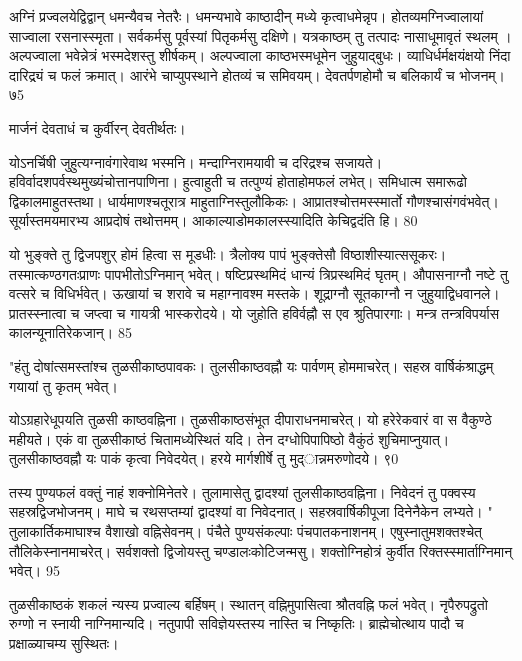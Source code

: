 अग्निं प्रज्वलयेद्विद्वान् धमन्यैवच नेतरैः।
धमन्यभावे काष्ठादीन् मध्ये कृत्वाधमेन्नृप।
होतव्यमग्निज्वालायां साज्वाला रसनास्स्मृता।
सर्वकर्मसु पूर्वस्यां पितृकर्मसु दक्षिणे।
यत्रकाष्ठम् तु तत्पादः नासाधूमावृतं स्थलम् ।
अल्पज्वाला भवेन्नेत्रं भस्मदेशस्तु शीर्षकम्।
अल्पज्वाला काष्ठभस्मधूमेन जुहुयाद्बुधः।
व्याधिर्धर्मक्षयंक्षयो निंदा दारिद्र्यं च फलं क्रमात्।
आरंभे चाप्युपस्थाने होतव्यं च समिवयम्।
देवतर्पणहोमौ च बलिकार्यं च भोजनम्।
७5

मार्जनं देवताधं च कुर्वीरन् देवतीर्थतः।

योऽनर्चिषी जुहुत्यग्नावंगारेवाथ भस्मनि।
मन्दाग्निरामयावी च दरिद्रश्च सजायते।
हविर्वादशपर्वस्थमुख्यंचोत्तानपाणिना।
हुत्वाहुती च तत्पुण्यं होताहोमफलं लभेत्।
समिधात्म समारूढो द्विकालमाहुतस्तथा।
धार्यमाणश्चतूरात्र माहुताग्निस्तुलौकिकः।
आप्रातश्चोत्तमस्स्मार्तो गौणश्चासंगवंभवेत्।
सूर्यास्तमयमारभ्य आप्रदोषं तथोत्तमम्।
आकाल्याडोमकालस्स्यादिति केचिद्वदंति हि।
80

यो भुङ्क्ते तु द्विजपशुर् होमं हित्वा स मूडधीः।
त्रैलोक्य पापं भुङ्क्तेसौ विष्ठाशीस्यात्ससूकरः।
तस्मात्कण्ठगतःप्राणः पापभीतोऽग्निमान् भवेत्।
षष्टिप्रस्थमिदं धान्यं त्रिप्रस्थमिदं घृतम्।
औपासनाग्नौ नष्टे तु वत्सरे च विधिर्भवेत्।
ऊखायां च शरावे च महाग्नावश्म मस्तके।
शूद्राग्नौ सूतकाग्नौ न जुहुयाद्विधवानले।
प्रातस्स्नात्वा च जप्त्वा च गायत्री भास्करोदये।
यो जुहोति हविर्वह्नौ स एव श्रुतिपारगाः।
मन्त्र तन्त्रविपर्यास कालन्यूनातिरेकजान्।
85

"हंतु दोषांत्समस्तांश्च तुळसीकाष्ठपावकः।
तुलसीकाष्ठवह्नौ यः पार्वणम् होममाचरेत्।
सहस्र वार्षिकंश्राद्धम् गयायां तु कृतम् भवेत्।

योऽग्रहारेधूपयति तुळसी काष्ठवह्निना।
तुळसीकाष्ठसंभूत दीपाराधनमाचरेत्।
यो हरेरेकवारं वा स वैकुण्ठे महीयते।
एकं वा तुळसीकाष्ठं चितामध्येस्थितं यदि।
तेन दग्धोपिपापिष्ठो वैकुंठं शुचिमाप्नुयात्।
तुलसीकाष्ठवह्नौ यः पाकं कृत्वा निवेदयेत्।
हरये मार्गशीर्षे तु मुद्ान्नमरुणोदये।
९0

तस्य पुण्यफलं वक्तुं नाहं शक्नोमिनेतरे।
तुलामासेतु द्वादश्यां तुलसीकाष्ठवह्निना।
निवेदनं तु पक्वस्य सहस्रद्विजभोजनम्।
माघे च रथसप्तम्यां द्वादश्यां वा निवेदनात्।
सहस्रवार्षिकीपूजा दिनेनैकेन लभ्यते।
" तुलाकार्तिकमाघाश्च वैशाखो वह्निसेवनम्।
पंचैते पुण्यसंकल्पाः पंचपातकनाशनम्।
एषुस्नातुमशक्तश्चेत् तौलिकेस्नानमाचरेत्।
सर्वशक्तो द्विजोयस्तु चण्डालःकोटिजन्मसु।
शक्तोग्निहोत्रं कुर्वीत रिक्तस्स्मार्ताग्निमान् भवेत्।
95

तुळसीकाष्ठकं शकलं न्यस्य प्रज्वाल्य बर्हिषम्।
स्थातन् वह्निमुपासित्वा श्रौतवह्नि फलं भवेत्।
नृपैरुपद्रुतो रुग्णो न स्नायी नाग्निमान्यदि।
नतुपापी सविज्ञेयस्तस्य नास्ति च निष्कृतिः।
ब्राह्मेचोत्थाय पादौ च प्रक्षाळ्याचम्य सुस्थितः।

